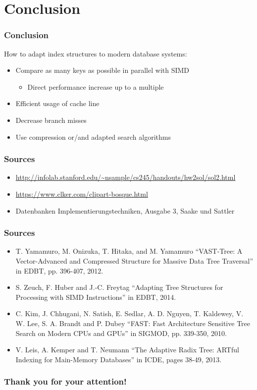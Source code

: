 \documentclass{beamer}
\begin{document}
\section{Conclusion}
\begin{frame}
\frametitle{Conclusion}
How to adapt index structures to modern database systems:
\begin{itemize}
	\item Compare as many keys as possible in parallel with SIMD
	\begin{itemize}
		\item Direct performance increase up to a multiple
	\end{itemize}
	\item Efficient usage of cache line
	\item Decrease branch misses
	\item Use compression or/and adapted search algorithms
	\end{itemize}
\end{frame}

\begin{frame}
\frametitle{Sources}
\begin{itemize}
	\item \url{http://infolab.stanford.edu/~nsample/cs245/handouts/hw2sol/sol2.html}
	\item \url{https://www.clker.com/clipart-bosque.html}
	\item Datenbanken Implementierungstechniken, Ausgabe 3, Saake und Sattler
\end{itemize}
\end{frame}

\begin{frame}
\frametitle{Sources}
\begin{itemize}
	\item T. Yamamuro, M. Onizuka, T. Hitaka, and M. Yamamuro ``VAST-Tree: A Vector-Advanced and Compressed Structure for Massive Data Tree Traversal'' in EDBT, pp. 396-407, 2012.
	\item S. Zeuch, F. Huber and J.-C. Freytag  ``Adapting Tree Structures for Processing with SIMD Instructions'' in EDBT, 2014.
	\item C. Kim, J. Chhugani, N. Satish, E. Sedlar, A. D. Nguyen, T. Kaldewey, V. W. Lee, S. A. Brandt and P. Dubey ``FAST: Fast Architecture Sensitive Tree Search on Modern CPUs and GPUs'' in SIGMOD, pp. 339-350, 2010.
	\item V. Leis, A. Kemper and T. Neumann ``The Adaptive Radix Tree: ARTful Indexing for Main-Memory Databases'' in ICDE, pages 38-49, 2013.
\end{itemize}
\end{frame}

\begin{frame}
 \frametitle{Thank you for your attention!}
\end{frame}
\end{document}
